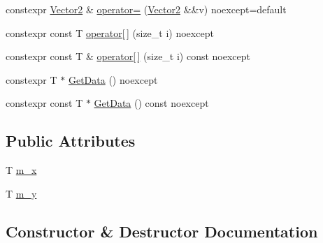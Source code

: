 \begin{DoxyCompactItemize}
constexpr \hyperlink{structmage_1_1_vector2}{Vector2} \& \hyperlink{structmage_1_1_vector2_3_01_t_00_01typename_01std_1_1enable__if__t_3_01std_1_1is__arithmetic__v_3_01_t_01_4_01_4_01_4_ae4d5a089c4b4017c4950841b7d53a0bf}{operator=} (\hyperlink{structmage_1_1_vector2}{Vector2} \&\&v) noexcept=default
\item 
constexpr const T \hyperlink{structmage_1_1_vector2_3_01_t_00_01typename_01std_1_1enable__if__t_3_01std_1_1is__arithmetic__v_3_01_t_01_4_01_4_01_4_ab245c95edacf2e3a8aadb97cc4dbf211}{operator\mbox{[}$\,$\mbox{]}} (size\+\_\+t i) noexcept
\item 
constexpr const T \& \hyperlink{structmage_1_1_vector2_3_01_t_00_01typename_01std_1_1enable__if__t_3_01std_1_1is__arithmetic__v_3_01_t_01_4_01_4_01_4_a0e96acf1f18b42074fdf8c6f846d51cf}{operator\mbox{[}$\,$\mbox{]}} (size\+\_\+t i) const noexcept
\item 
constexpr T $\ast$ \hyperlink{structmage_1_1_vector2_3_01_t_00_01typename_01std_1_1enable__if__t_3_01std_1_1is__arithmetic__v_3_01_t_01_4_01_4_01_4_a532ee64d7de5e64d82ef95242e67f705}{Get\+Data} () noexcept
\item 
constexpr const T $\ast$ \hyperlink{structmage_1_1_vector2_3_01_t_00_01typename_01std_1_1enable__if__t_3_01std_1_1is__arithmetic__v_3_01_t_01_4_01_4_01_4_abf8d45409a3744829bfaa51dff97b5a4}{Get\+Data} () const noexcept
\end{DoxyCompactItemize}
\subsection*{Public Attributes}
\begin{DoxyCompactItemize}
\item 
T \hyperlink{structmage_1_1_vector2_3_01_t_00_01typename_01std_1_1enable__if__t_3_01std_1_1is__arithmetic__v_3_01_t_01_4_01_4_01_4_a7debd78f3781c92b8612631331571740}{m\+\_\+x}
\item 
T \hyperlink{structmage_1_1_vector2_3_01_t_00_01typename_01std_1_1enable__if__t_3_01std_1_1is__arithmetic__v_3_01_t_01_4_01_4_01_4_ac84020904b44330213e8d1c21b4972ab}{m\+\_\+y}
\end{DoxyCompactItemize}


\subsection{Constructor \& Destructor Documentation}
\hypertarget{structmage_1_1_vector2_3_01_t_00_01typename_01std_1_1enable__if__t_3_01std_1_1is__arithmetic__v_3_01_t_01_4_01_4_01_4_aaf3e924cfd222f8947bbd9f2333b18d8}{}\label{structmage_1_1_vector2_3_01_t_00_01typename_01std_1_1enable__if__t_3_01std_1_1is__arithmetic__v_3_01_t_01_4_01_4_01_4_aaf3e924cfd222f8947bbd9f2333b18d8} 
